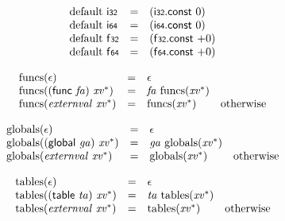 $$
\begin{array}{@{}lcl@{}l@{}}
{\mathrm{default}}~\mathsf{i{\scriptstyle32}} &=& (\mathsf{i{\scriptstyle32}}.\mathsf{const}~0) &  \\
{\mathrm{default}}~\mathsf{i{\scriptstyle64}} &=& (\mathsf{i{\scriptstyle64}}.\mathsf{const}~0) &  \\
{\mathrm{default}}~\mathsf{f{\scriptstyle32}} &=& (\mathsf{f{\scriptstyle32}}.\mathsf{const}~{+0}) &  \\
{\mathrm{default}}~\mathsf{f{\scriptstyle64}} &=& (\mathsf{f{\scriptstyle64}}.\mathsf{const}~{+0}) &  \\
\end{array}
$$

\vspace{1ex}

$$
\begin{array}{@{}lcl@{}l@{}}
{\mathrm{funcs}}(\epsilon) &=& \epsilon &  \\
{\mathrm{funcs}}((\mathsf{func}~{\mathit{fa}})~{{\mathit{xv}}^\ast}) &=& {\mathit{fa}}~{\mathrm{funcs}}({{\mathit{xv}}^\ast}) &  \\
{\mathrm{funcs}}({\mathit{externval}}~{{\mathit{xv}}^\ast}) &=& {\mathrm{funcs}}({{\mathit{xv}}^\ast}) &\quad
  \mbox{otherwise} \\
\end{array}
$$

$$
\begin{array}{@{}lcl@{}l@{}}
{\mathrm{globals}}(\epsilon) &=& \epsilon &  \\
{\mathrm{globals}}((\mathsf{global}~{\mathit{ga}})~{{\mathit{xv}}^\ast}) &=& {\mathit{ga}}~{\mathrm{globals}}({{\mathit{xv}}^\ast}) &  \\
{\mathrm{globals}}({\mathit{externval}}~{{\mathit{xv}}^\ast}) &=& {\mathrm{globals}}({{\mathit{xv}}^\ast}) &\quad
  \mbox{otherwise} \\
\end{array}
$$

$$
\begin{array}{@{}lcl@{}l@{}}
{\mathrm{tables}}(\epsilon) &=& \epsilon &  \\
{\mathrm{tables}}((\mathsf{table}~{\mathit{ta}})~{{\mathit{xv}}^\ast}) &=& {\mathit{ta}}~{\mathrm{tables}}({{\mathit{xv}}^\ast}) &  \\
{\mathrm{tables}}({\mathit{externval}}~{{\mathit{xv}}^\ast}) &=& {\mathrm{tables}}({{\mathit{xv}}^\ast}) &\quad
  \mbox{otherwise} \\
\end{array}
$$

